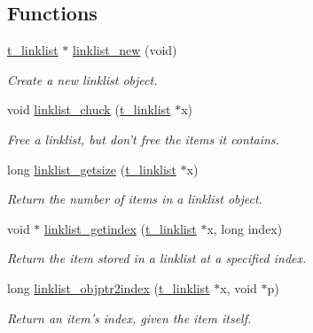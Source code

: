 \subsection*{Functions}
\begin{DoxyCompactItemize}
\item 
\hyperlink{structt__linklist}{t\_\-linklist} $\ast$ \hyperlink{group__linklist_ga62dba349046e7f84cf34c9c80f04d44a}{linklist\_\-new} (void)
\begin{DoxyCompactList}\small\item\em Create a new linklist object. \item\end{DoxyCompactList}\item 
void \hyperlink{group__linklist_ga033f4bf2a9f806e168697b5ce0f6331e}{linklist\_\-chuck} (\hyperlink{structt__linklist}{t\_\-linklist} $\ast$x)
\begin{DoxyCompactList}\small\item\em Free a linklist, but don't free the items it contains. \item\end{DoxyCompactList}\item 
long \hyperlink{group__linklist_ga71472259406fa8ceb8fad80d23259357}{linklist\_\-getsize} (\hyperlink{structt__linklist}{t\_\-linklist} $\ast$x)
\begin{DoxyCompactList}\small\item\em Return the number of items in a linklist object. \item\end{DoxyCompactList}\item 
void $\ast$ \hyperlink{group__linklist_ga4d64ccb54a70c0a2a9b3fb68e495d9f4}{linklist\_\-getindex} (\hyperlink{structt__linklist}{t\_\-linklist} $\ast$x, long index)
\begin{DoxyCompactList}\small\item\em Return the item stored in a linklist at a specified index. \item\end{DoxyCompactList}\item 
long \hyperlink{group__linklist_ga6ec787cba5eb1c47c294692d4c62e609}{linklist\_\-objptr2index} (\hyperlink{structt__linklist}{t\_\-linklist} $\ast$x, void $\ast$p)
\begin{DoxyCompactList}\small\item\em Return an item's index, given the item itself. \item\end{DoxyCompactList}\item 

\end{DoxyCompactItemize}

